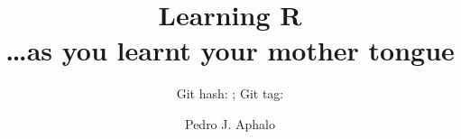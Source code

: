 \documentclass[paper=a4,headsepline,BCOR=12mm,twoside,open=right,%
titlepage,headings=small,fontsize=10pt,index=totoc,bibliography=totoc,%
captions=tableheading,captions=nooneline]{scrbook}\usepackage{knitr}
\begin{document}
\renewcommand*\chapterformat{\thechapter\autodot\hspace{1em}}

\renewcommand*\dictumwidth{0.7\linewidth}
\renewcommand*\dictumauthorformat[1]{--- #1}

\extratitle{\vspace*{4\baselineskip}%
             {\Huge\textsf{\textbf{Learning R}\\ \textsl{\ldots as you learnt your mother tongue}}}}

\subject{\textsf{Department of Biosciences, University of Helsinki}}

\title{\Huge{\sffamily Learning R\\{\large\ldots as you learnt your mother tongue}}}

\subtitle{Git hash: \gitAbbrevHash; Git tag: \gitVtagn}

\author{Pedro J. Aphalo}

\date{\gitAuthorIsoDate}

\publishers{Unpublished}

\uppertitleback{\copyright\ 2001--2016 by Pedro J. Aphalo\\
Licensed under the \href{http://creativecommons.org/licenses/}{Creative Commons licenses} indicated for each individual article, or when not explicitly indicated, under the \href{http://creativecommons.org/licenses/by-sa/4.0/}{CC BY-SA 4.0 license}.}

\lowertitleback{Typeset with \href{http://www.latex-project.org/}{\XeLaTeX}\ in Lucida Bright and \textsf{Lucida Sans} using the KOMA-Script book class.\\
The manuscript was written using \href{http://www.r-project.org/}{R} with package knitr. The manuscript was edited in \href{http://www.winedt.com/}{WinEdt} and \href{http://www.rstudio.com/}{RStudio}.
The source files for the whole book are available at \url{https://bitbucket.org/aphalo/using-r}.}

\frontmatter











\end{document}
